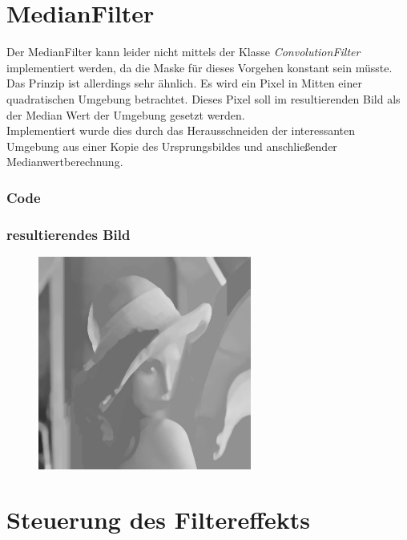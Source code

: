 \documentclass[12pt,german]{article}
\begin{document}
\section{MedianFilter}
Der MedianFilter kann leider nicht mittels der Klasse \textit{ConvolutionFilter} implementiert werden, da die Maske für dieses Vorgehen konstant sein müsste. Das Prinzip ist allerdings sehr ähnlich. Es wird ein Pixel in Mitten einer quadratischen Umgebung betrachtet. Dieses Pixel soll im resultierenden Bild als der Median Wert der Umgebung gesetzt werden. \\
Implementiert wurde dies durch das Herausschneiden der interessanten Umgebung aus einer Kopie des Ursprungsbildes und anschließender Medianwertberechnung. 
\subsubsection{Code}

\subsubsection{resultierendes Bild}
\begin{figure}[h]
	\includegraphics[width=7cm]{../testData/Results/median.jpg}
\end{figure}



\newpage
\section{Steuerung des Filtereffekts }
\end{document}
